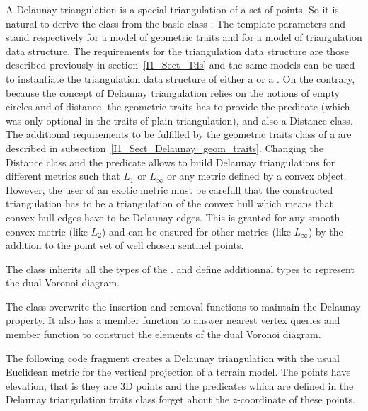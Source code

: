 A Delaunay triangulation is a special triangulation of a set of points.
So it is natural to derive  the class 
from the basic class .
The template parameters  and  stand 
respectively
for a model of geometric traits and for a model of triangulation data structure.
The requirements for the triangulation data structure
are those described previously in section~\ref{I1_Sect_Tds}
and the same models can be used to instantiate the
triangulation data structure of either a 
or a . On the contrary, because the
concept of Delaunay triangulation relies on the notions of 
empty circles and of distance, 
the geometric traits has to provide
the  predicate
(which was only optional in the traits of plain triangulation),
and also
a Distance class. The additional requirements
to be fulfilled by the geometric traits class
of a  are described in 
subsection~\ref{I1_Sect_Delaunay_geom_traits}. 
Changing the Distance class and the  predicate 
allows to build Delaunay triangulations for different metrics
such that $L_1$ or $L_{\infty}$ or any metric defined by a
convex object. However, the user of an exotic metric
must be carefull that the constructed triangulation 
has to be a triangulation of the convex hull
which means that convex hull edges have to be Delaunay edges.
This is granted for any smooth convex metric (like $L_2$)
and can be ensured for other metrics (like  $L_{\infty}$)
by the addition to the point set of well chosen sentinel points.


The class 
inherits all the types of the .
and define additionnal types to represent the dual Voronoi diagram.
\ccGlue
{}
\ccGlue
{}

The class 
overwrite the insertion and removal  functions
to maintain the Delaunay property.
It also has a member function to answer nearest vertex queries
and member function to construct the elements of the dual Voronoi diagram.

\ccExample
The following code fragment creates a Delaunay triangulation with 
the usual Euclidean metric for the vertical projection of a 
terrain model. The points have elevation, that is they are 3D points
and the predicates which are defined in the Delaunay triangulation 
traits class forget about the $z$-coordinate of these points. 

